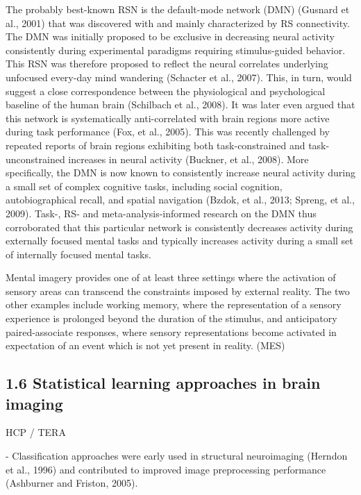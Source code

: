 \documentclass[authoryear,review,3p]{elsarticle}
\begin{document}
The probably best-known RSN is the default-mode network (DMN) (Gusnard et al., 2001) that was discovered with and mainly characterized by RS connectivity. The DMN was initially proposed to be exclusive in decreasing neural activity consistently during experimental paradigms requiring stimulus-guided behavior. This RSN was therefore proposed to reflect the neural correlates underlying unfocused every-day mind wandering (Schacter et al., 2007). This, in turn, would suggest a close correspondence between the physiological and psychological baseline of the human brain (Schilbach et al., 2008). It was later even argued that this network is systematically anti-correlated with brain regions more active during task performance (Fox, et al., 2005). This was recently challenged by repeated reports of brain regions exhibiting both task-constrained and task-unconstrained increases in neural activity (Buckner, et al., 2008). More specifically, the DMN is now known to consistently increase neural activity during a small set of complex cognitive tasks, including social cognition, autobiographical recall, and spatial navigation (Bzdok, et al., 2013; Spreng, et al., 2009). Task-, RS- and meta-analysis-informed research on the DMN thus corroborated that this particular network is consistently decreases activity during externally focused mental tasks and typically increases activity during a small set of internally focused mental tasks.

Mental imagery provides one of at least three settings where the activation of sensory areas can transcend the constraints imposed by external reality. The two other examples include working memory, where the representation of a sensory experience is prolonged beyond the duration of the stimulus, and anticipatory paired-associate responses, where sensory representations become activated in expectation of an event which is not yet present in reality. (MES)




\subsection*{1.6 Statistical learning approaches in brain imaging}

HCP / TERA

- Classification approaches were early used in structural neuroimaging (Herndon et al., 1996) and contributed to improved image preprocessing performance (Ashburner and Friston, 2005).
\end{document}

